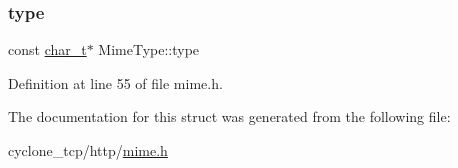\mbox{\label{structMimeType_ac2acbe0a170d917f3d003c768ab6d707}} 
\subsubsection{\texorpdfstring{type}{type}}
{\footnotesize\ttfamily const \hyperlink{compiler__port_8h_a40bb5262bf908c328fbcfbe5d29d0201}{char\+\_\+t}$\ast$ Mime\+Type\+::type}



Definition at line 55 of file mime.\+h.



The documentation for this struct was generated from the following file\+:\begin{DoxyCompactItemize}
\item 
cyclone\+\_\+tcp/http/\hyperlink{mime_8h}{mime.\+h}\end{DoxyCompactItemize}
